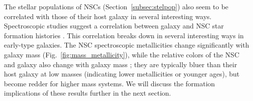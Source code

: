 The stellar populations of NSCs (Section~\ref{subsec:stelpop}) also seem to be correlated with those of their host galaxy in several interesting ways.  Spectroscopic studies suggest a correlation between galaxy and NSC star formation histories \citep[e.g.][]{kacharov18}.  This correlation breaks down in several interesting ways in early-type galaxies.  The NSC spectroscopic metallicities change significantly with galaxy mass (Fig.~\ref{fig:mass_metallicity}), while the relative colors of the NSC and galaxy also change with galaxy mass \citep{turner12,sanchez-janssen19}; they are typically bluer than their host galaxy at low masses (indicating lower metallicities or younger ages), but become redder for higher mass systems. We will discuss the formation implications of these results further in the next section.

